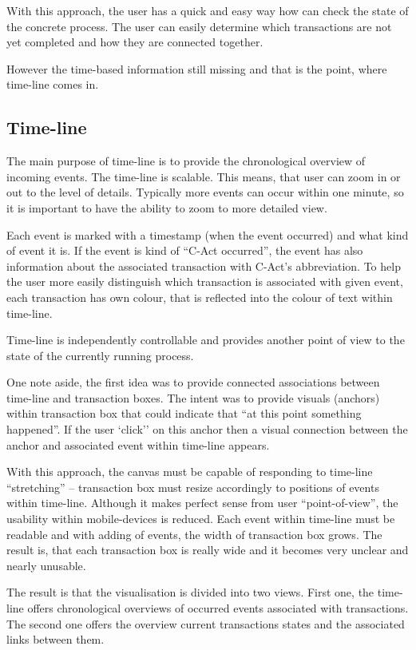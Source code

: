 With this approach, the user has a quick and easy way how can check the state of the concrete process. The user can easily determine which transactions are not yet completed and how they are connected together. 

However the time-based information still missing and that is the point, where time-line comes in.
\subsection{Time-line}
The main purpose of time-line is to provide the chronological overview of incoming events. The time-line is scalable. This means, that user can zoom in or out to the level of details. Typically more events can occur within one minute, so it is important to have the ability to zoom to more detailed view. 

Each event is marked with a timestamp (when the event occurred) and what kind of event it is. If the event is kind of ``C-Act occurred'', the event has also information about the associated transaction with C-Act's abbreviation. To help the user more easily distinguish which transaction is associated with given event, each transaction has own colour, that is reflected into the colour of text within time-line. 

Time-line is independently controllable and provides another point of view to the state of the currently running process. 

One note aside, the first idea was to provide connected associations between time-line and transaction boxes. The intent was to provide visuals (anchors) within transaction box that could indicate that ``at this point something happened''. If the user `click'' on this anchor then a visual connection between the anchor and associated event within time-line appears. 

With this approach, the canvas must be capable of responding to time-line ``stretching'' -- transaction box must resize accordingly to positions of events within time-line. Although it makes perfect sense from user ``point-of-view'', the usability within mobile-devices is reduced. Each event within time-line must be readable and with adding of events, the width of transaction box grows. The result is, that each transaction box is really wide and it becomes very unclear and nearly unusable.

The result is that the visualisation is divided into two views. First one, the time-line offers chronological overviews of occurred events associated with transactions. The second one offers the overview current transactions states and the associated links between them. 

